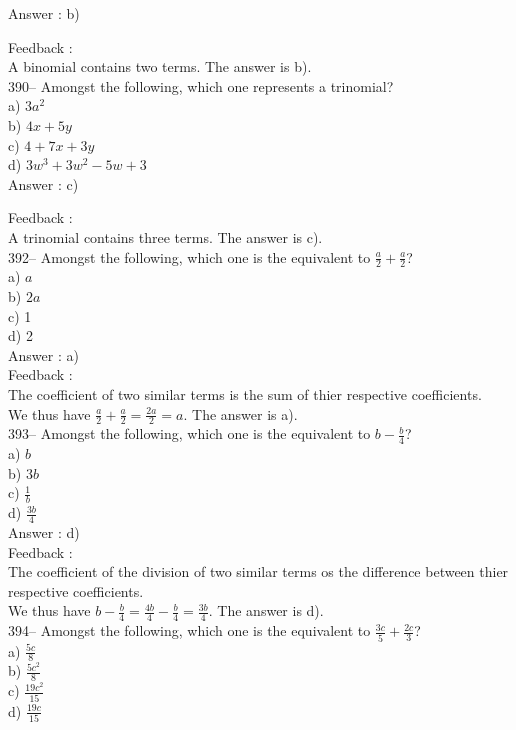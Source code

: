\documentclass[letterpaper, 12pt]{article}
\begin{document}
Answer : b)

Feedback : \\
A binomial contains two terms. The answer is b).\\

390-- Amongst the following, which one represents a trinomial?\\
a) $3a^{2}$\\
b) $4x+5y$\\
c) $4+7x+3y$\\
d) $3w^{3}+3w^{2}-5w+3$\\

Answer : c)

Feedback : \\
A trinomial contains three terms. The answer is c).\\


392-- Amongst the following, which one is the equivalent to $\frac{a}{2}+\frac{a}{2}$?\\
a) $a$\\
b) $2a$\\
c) 1\\
d) 2\\

Answer : a)\\

Feedback : \\
The coefficient of two similar terms is the sum of thier respective coefficients.\\[2mm]
We thus have $\frac{a}{2}+\frac{a}{2}=\frac{2a}{2}=a$.  The answer is a).\\

393-- Amongst the following, which one is the equivalent to $b-\frac{b}{4}$?\\
a) $b$\\[2mm]
b) $3b$\\[2mm]
c) $\frac{1}{b}$\\[2mm]
d) $\frac{3b}{4}$\\

Answer : d)\\

Feedback : \\
The coefficient of the division of two similar terms os the difference between thier respective coefficients.\\[2mm]
We thus have $b-\frac{b}{4}=\frac{4b}{4}-\frac{b}{4}=\frac{3b}{4}$. The answer is d).\\

394-- Amongst the following, which one is the equivalent to
$\frac{3c}{5}+\frac{2c}{3}$?\\
a) $\frac{5c}{8}$\\[2mm]
b) $\frac{5c^{2}}{8}$\\[2mm]
c) $\frac{19c^{2}}{15}$\\[2mm]
d) $\frac{19c}{15}$\\
\end{document}
